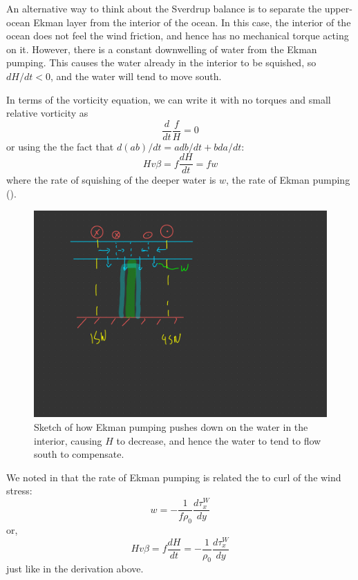 An alternative way to think about the Sverdrup balance is to separate the upper-ocean Ekman layer from the interior of the ocean.  In this case, the interior of the ocean does not feel the wind friction, and hence has no mechanical torque acting on it.  However, there is a constant downwelling of water from the Ekman pumping.  This causes the water already in the interior to be squished, so $dH/dt < 0$, and the water will tend to move south.

In terms of the vorticity equation, we can write it with no torques and small relative vorticity as 
\begin{equation}
    \frac{d}{dt}\frac{f}{H} = 0
\end{equation}
or using the the fact that $d(ab)/dt = adb/dt + b da/dt$:
\begin{equation}
    Hv\beta = f \frac{dH}{dt} = f w
\end{equation}
where the rate of squishing of the deeper water is $w$, the rate of Ekman pumping ().  

\begin{figure}[hbt]
  \begin{center}
    \includegraphics{figs/Sverdrup/SverdrupEkman}
    \caption{Sketch of how Ekman pumping pushes down on the water in the interior, causing $H$ to decrease, and hence the water to tend to flow south to compensate.}
    \label{fig:SverdrupEkman}  
  \end{center}
\end{figure}

We noted in  that the rate of Ekman pumping is related the to curl of the wind stress:
\begin{equation}
    w = -\frac{1}{f\rho_0}\frac{d\tau_x^W}{dy}
\end{equation}
or, 
\begin{equation}
    Hv\beta = f \frac{dH}{dt} = -\frac{1}{\rho_0}\frac{d\tau_x^W}{dy}
\end{equation}
just like in the derivation above. 



